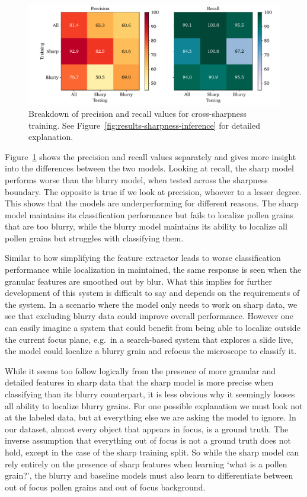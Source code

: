 \begin{figure}[htbp]
  \centering
  \includegraphics[width=\textwidth]{figs/results/sharpness/confustion_balanced_test_dual.pdf}
  \caption[Precision \& Recall across sharpness boundary]{%
Breakdown of precision and recall values for cross-sharpness training. See Figure~\ref{fig:results-sharpness-inference} for detailed explanation.
  }\label{fig:results-sharpness-pr-rec}
\end{figure}

Figure~\ref{fig:results-sharpness-pr-rec} shows the precision and recall values separately and gives more insight into the differences between the two models.
Looking at recall, the sharp model performs worse than the blurry model, when tested across the sharpness boundary.
The opposite is true if we look at precision, whoever to a lesser degree.
This shows that the models are underperforming for different reasons.
The sharp model maintains its classification performance but fails to localize pollen grains that are too blurry, while the blurry model maintains its ability to localize all pollen grains but struggles with classifying them.

Similar to how simplifying the feature extractor leads to worse classification performance while localization in maintained, the same response is seen when the granular features are smoothed out by blur.
What this implies for further development of this system is difficult to say and depends on the requirements of the system.
In a scenario where the model only needs to work on sharp data, we see that excluding blurry data could improve overall performance.
However one can easily imagine a system that could benefit from being able to localize outside the current focus plane, e.g.~in a  search-based system that explores a slide live, the model could localize a blurry grain and refocus the microscope to classify it.

While it seems too follow logically from the presence of more granular and detailed features in sharp data that the sharp model is more precise when classifying than its blurry counterpart, it is less obvious why it seemingly looses all ability to localize blurry grains.
For one possible explanation we must look not at the labeled data, but at everything else we are asking the model to ignore.
In our dataset, almost every object that appears in focus, is a ground truth.
The inverse assumption that everything out of focus is not a ground truth does not hold, except in the case of the sharp training split.
So while the sharp model can rely entirely on the presence of sharp features when learning `what is a pollen grain?', the blurry and baseline models must also learn to differentiate between out of focus pollen grains and out of focus background.